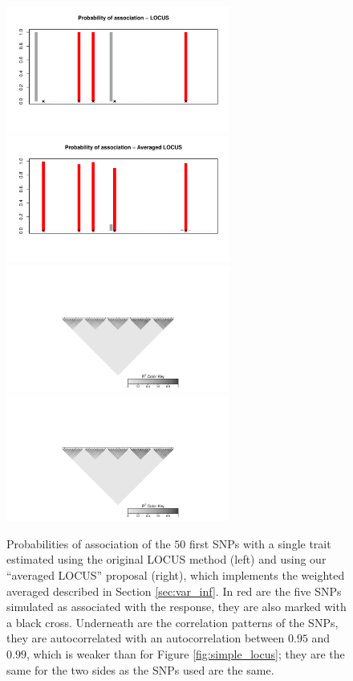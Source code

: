 \documentclass[a4paper, 11pt]{report}
\numberwithin{equation}{chapter}
\begin{document}
\begin{figure}[h]
\centering
\includegraphics[width=2.9in, bb= 0 0 8in 4in]{images/proba_weak.pdf}
\includegraphics[width=2.9in, bb= 0 0 8in 4in]{images/proba_weak_m.pdf}
\includegraphics[width=2.9in, bb= 1.32in 0 6.4in 2in]{images/LD_weak.pdf}
\includegraphics[width=2.9in, bb= 1.32in 0 6.4in 2in]{images/LD_weak.pdf}
\caption{\label{fig:weaker_locus}Probabilities of association of the $50$ first SNPs with a single trait estimated using the original LOCUS method (left) and using our ``averaged LOCUS'' proposal (right), which implements the weighted averaged described in Section \ref{sec:var_inf}. In red are the five SNPs simulated as associated with the response, they are also marked with a black cross. Underneath are the correlation patterns of the SNPs, they are autocorrelated with an autocorrelation between $0.95$ and $0.99$, which is weaker than for Figure \ref{fig:simple_locus}; they are the same for the two sides as the SNPs used are the same.}
\end{figure}
\end{document}
